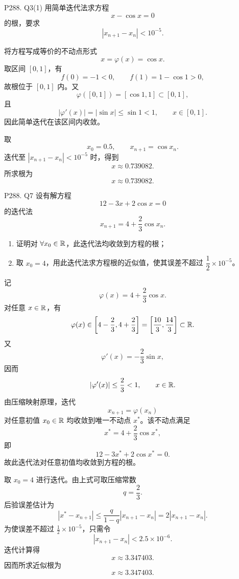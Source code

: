 \documentclass[11pt, a4paper, fontset=none]{ctexart}
\begin{document}
\begin{problem}{P288. Q3(1)}
    用简单迭代法求方程
    \[
        x-\cos x=0
    \]
    的根，要求
    \[
        |x_{n+1}-x_n|<10^{-5}.
    \]
\end{problem}

\begin{solution}
    将方程写成等价的不动点形式
    \[
        x=\varphi(x)=\cos x.
    \]
    取区间 $[0,1]$，有
    \[
        f(0)=-1<0,\qquad f(1)=1-\cos 1>0,
    \]
    故根位于 $[0,1]$ 内。又
    \[
        \varphi([0,1])=[\cos 1,1]\subset [0,1],
    \]
    且
    \[
        |\varphi'(x)|=|\sin x|\le \sin 1<1,\qquad x\in[0,1].
    \]
    因此简单迭代在该区间内收敛。

    取
    \[
        x_0=0.5,\qquad x_{n+1}=\cos x_n.
    \]
    迭代至 $|x_{n+1}-x_n|<10^{-5}$ 时，得到
    \[
        x\approx 0.739082.
    \]
    所求根为
    \[
        \boxed{x\approx 0.739082}.
    \]
\end{solution}


\begin{problem}{P288. Q7}
    设有解方程
    \[
        12-3x+2\cos x=0
    \]
    的迭代法
    \[
        x_{n+1}=4+\frac{2}{3}\cos x_n.
    \]
    \begin{enumerate}[(1)]
        \item 证明对 $\forall x_0\in\mathbb{R}$，此迭代法均收敛到方程的根；
        \item 取 $x_0=4$，用此迭代法求方程根的近似值，使其误差不超过 $\dfrac{1}{2}\times 10^{-5}$。
    \end{enumerate}
\end{problem}

\begin{solution}
    记
    \[
        \varphi(x)=4+\frac{2}{3}\cos x.
    \]
    对任意 $x\in\mathbb{R}$，有
    \[
        \varphi(x)\in \left[4-\frac{2}{3},4+\frac{2}{3}\right]
        =\left[\frac{10}{3},\frac{14}{3}\right]\subset \mathbb{R}.
    \]
    又
    \[
        \varphi'(x)=-\frac{2}{3}\sin x,
    \]
    因而
    \[
        |\varphi'(x)|\le \frac{2}{3}<1,\qquad x\in\mathbb{R}.
    \]
    由压缩映射原理，迭代
    \[
        x_{n+1}=\varphi(x_n)
    \]
    对任意初值 $x_0\in\mathbb{R}$ 均收敛到唯一不动点 $x^\ast$。该不动点满足
    \[
        x^\ast=4+\frac{2}{3}\cos x^\ast,
    \]
    即
    \[
        12-3x^\ast+2\cos x^\ast=0.
    \]
    故此迭代法对任意初值均收敛到方程的根。

    取 $x_0=4$ 进行迭代。由上式可取压缩常数
    \[
        q=\frac{2}{3}.
    \]
    后验误差估计为
    \[
        |x^\ast-x_{n+1}|
        \le \frac{q}{1-q}|x_{n+1}-x_n|
        =2|x_{n+1}-x_n|.
    \]
    为使误差不超过 $\frac{1}{2}\times 10^{-5}$，只需令
    \[
        |x_{n+1}-x_n|<2.5\times 10^{-6}.
    \]
    迭代计算得
    \[
        x\approx 3.347403.
    \]
    因而所求近似根为
    \[
        \boxed{x\approx 3.347403}.
    \]
\end{solution}
\end{document}
